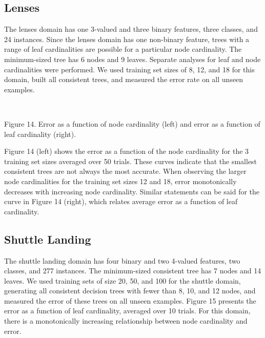 \subsection*{Lenses}

The lenses domain has one 3-valued and three binary features, three
classes, and 24 instances.  Since the lenses domain has one non-binary
feature, trees with a range of leaf cardinalities are possible for a
particular node cardinality. The minimum-sized tree has 6 nodes and 
9 leaves.  Separate analyses for leaf and node cardinalities were 
performed.  We used training set sizes
of 8, 12, and 18 for this domain, built all consistent trees, and
measured the error rate on all unseen examples.

\vspace*{0.3cm}
\hspace{2.5cm}
\centerline{\hbox{
  }}

\vspace{0.2cm}
\parindent 0.0cm
Figure 14. Error as a function of node cardinality (left) and error as a 
function of leaf cardinality (right).\\
\parindent 0.6cm
\parskip 0.0cm

Figure 14 (left) shows the error as a function of the node cardinality for
the 3 training set sizes averaged over 50 trials.  These curves
indicate that the smallest consistent trees are not always the most
accurate.  When observing the larger node cardinalities for the
training set sizes 12 and 18, error monotonically decreases with
increasing node cardinality.  Similar statements can be said for the
curve in Figure 14 (right), which relates average error as a function of leaf
cardinality.

\subsection*{Shuttle Landing}

The shuttle landing domain has four binary and two 4-valued features,
two classes, and 277 instances. The minimum-sized consistent tree has
7 nodes and 14 leaves.  We used training sets of size 20, 50,
and 100 for the shuttle domain, generating all consistent decision
trees with fewer than 8, 10, and 12 nodes, and measured the error of
these trees on all unseen examples.  Figure 15 presents the error as a
function of leaf cardinality, averaged over 10 trials.  For this
domain, there is a monotonically increasing relationship between node
cardinality and error.

